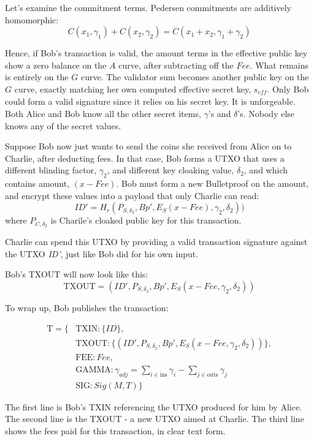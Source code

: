 \documentclass[a4paper, 10pt, conference]{ieeeconf}
\begin{document}
Let's examine the commitment terms. Pedersen commitments are additively homomorphic:
$$C(x_1, \gamma_1) + C(x_2, \gamma_2) = C(x_1 + x_2, \gamma_1 + \gamma_2)$$

Hence, if Bob's transaction is valid, the amount terms in the effective public key show a zero balance on the $A$ curve, after subtracting off the $\mathit{Fee}$. What remains is entirely on the $G$ curve. The validator sum becomes another public key on the $G$ curve, exactly matching her own computed effective secret key, $s_{\mathit{eff}}$. Only Bob could form a valid signature since it relies on his secret key. It is unforgeable. Both Alice and Bob know all the other secret items, $\gamma$'s and $\delta$'s. Nobody else knows any of the secret values.

Suppose Bob now just wants to send the coins she received from Alice on to Charlie, after deducting fees. In that case, Bob forms a UTXO that uses a different blinding factor, $\gamma_2$, and different key cloaking value, $\delta_2$, and which contains amount, $(x - \mathit{Fee})$. Bob must form a new Bulletproof on the amount, and encrypt these values into a payload that only Charlie can read:
$$ID' = H_r(P_{S, \delta_2}, Bp', E_S(x - Fee), \gamma_2, \delta_2))$$
where $P_{C, \delta_2}$ is Charile's cloaked public key for this transaction. 

Charlie can spend this UTXO by providing a valid transaction signature against the UTXO \textit{ID'}, just like Bob did for his own input. 

Bob's TXOUT will now look like this:
$$\text{TXOUT} = (ID', P_{S, \delta_2}, Bp', E_S(x - Fee, \gamma_2, \delta_2))$$

To wrap up, Bob publishes the transaction:

\begin{align*}
\text{T} = \{&\text{TXIN} : \{\mathit{ID}\}, \\
 &\text{TXOUT} : \{(\mathit{ID'}, P_{S, \delta_2}, \mathit{Bp'}, E_S(x - \mathit{Fee}, \gamma_2, \delta_2))\}, \\
 &\text{FEE} : \mathit{Fee}, \\
 &\text{GAMMA} : \gamma_{\mathit{adj}} = \sum_{i \in \text{ins}}{\gamma_i} - \sum_{j \in \text{outs}}{\gamma_j}\\
 &\text{SIG} : \mathit{Sig}(M, T)\}
\end{align*}

The first line is Bob's TXIN referencing the UTXO produced for him by Alice. The second line is the TXOUT - a new UTXO aimed at Charlie. The third line shows the fees paid for this transaction, in clear text form. 
\end{document}
